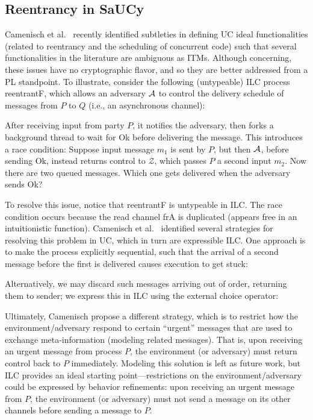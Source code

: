 \subsection{Reentrancy in SaUCy}
\label{subsec:reentrancy}

Camenisch et al.~\cite{camenisch2016universal} recently identified subtleties in
defining UC ideal functionalities (related to reentrancy and the scheduling of
concurrent code) such that several functionalities in the literature are
ambiguous as ITMs. Although concerning, these issues have no cryptographic
flavor, and so they are better addressed from a PL standpoint.  To illustrate,
consider the following (untypeable) ILC process \textsf{reentrantF}, which
allows an adversary $\mathcal{{A}}$ to control the delivery schedule of messages from
$P$ to $Q$ (i.e., an asynchronous channel):



After receiving input from party $P$, it notifies the adversary, then forks a
background thread to wait for \textsf{Ok} before delivering the message.  This
introduces a race condition: Suppose input message $m_1$ is sent by $P$, but
then $\mathcal{{A}}$, before sending \textsf{Ok}, instead returns control to $\mathcal
Z$, which passes $P$ a second input $m_2$. Now there are two queued
messages. Which one gets delivered when the adversary sends \textsf{Ok}?

To resolve this issue, notice that \textsf{reentrantF} is untypeable in ILC.
The race condition occurs because the read channel \textsf{frA} is duplicated
(appears free in an intuitionistic function).  Camenisch et
al.~\cite{camenisch2016universal} identified several strategies for resolving
this problem in UC, which in turn are expressible ILC. One approach is to make
the process explicitly sequential, such that the arrival of a second message
before the first is delivered causes execution to get stuck:

Alternatively, we may discard such messages arriving out of order, returning
them to sender; we express this in ILC using the external choice operator:


Ultimately, Camenisch \etal propose a different strategy, which is to restrict
how the environment/adversary respond to certain ``urgent'' messages that are
used to exchange meta-information (modeling related messages). That is, upon
receiving an urgent message from process $P$, the environment (or adversary)
must return control back to $P$ immediately. Modeling this solution is left as
future work, but ILC provides an ideal starting point---restrictions on the
environment/adversary could be expressed by behavior refinements: upon receiving
an urgent message from $P$, the environment (or adversary) must not send a
message on its other channels before sending a message to $P$.
